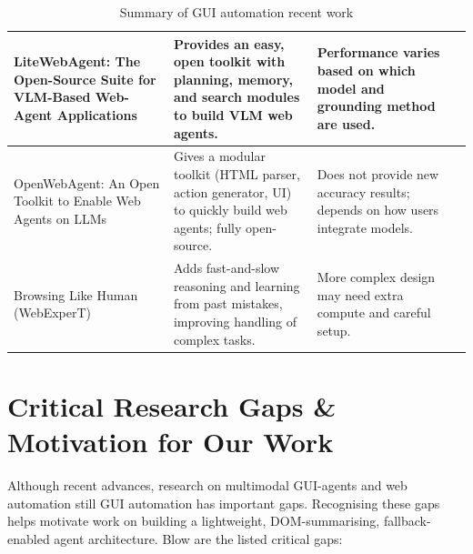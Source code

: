 \begin{table}[!h]
\begin{tabularx}{\textwidth}{X|X|X|c}
LiteWebAgent: The Open-Source Suite for VLM-Based Web-Agent Applications &
Provides an easy, open toolkit with planning, memory, and search modules to build VLM web agents. &
Performance varies based on which model and grounding method are used. 
& \cite{zhang2025litewebagentopensourcesuitevlmbased} \\
\hline

OpenWebAgent: An Open Toolkit to Enable Web Agents on LLMs &
Gives a modular toolkit (HTML parser, action generator, UI) to quickly build web agents; fully open-source. &
Does not provide new accuracy results; depends on how users integrate models.
& \cite{iong2024openwebagent} \\
\hline

Browsing Like Human (WebExperT) &
Adds fast-and-slow reasoning and learning from past mistakes, improving handling of complex tasks. &
More complex design may need extra compute and careful setup.
& \cite{Browsinglikehuman:luo2025browsing} \\
\hline

\end{tabularx}
\caption{Summary of GUI automation recent work}
\label{Literature:SummaryTable}
\end{table}


\section{Critical Research Gaps \& Motivation for Our Work}
Although recent advances, research on multimodal GUI-agents and web automation still GUI automation has important gaps. Recognising these gaps helps motivate work on building a lightweight, DOM-summarising, fallback-enabled agent architecture. Blow are the listed critical gaps:

